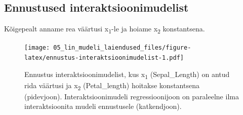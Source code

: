 \documentclass[]{book}
\newenvironment{Shaded}{\begin{snugshade}}{\end{snugshade}}
\newcommand{\DataTypeTok}[1]{\textcolor[rgb]{0.13,0.29,0.53}{#1}}
\newcommand{\DecValTok}[1]{\textcolor[rgb]{0.00,0.00,0.81}{#1}}
\newcommand{\KeywordTok}[1]{\textcolor[rgb]{0.13,0.29,0.53}{\textbf{#1}}}
\newcommand{\NormalTok}[1]{#1}
\newcommand{\OperatorTok}[1]{\textcolor[rgb]{0.81,0.36,0.00}{\textbf{#1}}}
\newcommand{\StringTok}[1]{\textcolor[rgb]{0.31,0.60,0.02}{#1}}
\begin{document}
\hypertarget{ennustused-interaktsioonimudelist}{%
\subsection*{Ennustused interaktsioonimudelist}\label{ennustused-interaktsioonimudelist}}

Kõigepealt anname rea väärtusi x\textsubscript{1}-le ja hoiame x\textsubscript{2} konstantsena.



\begin{Shaded}
\end{Shaded}

\begin{figure}
\centering
\texttt{[image: 05\_lin\_mudeli\_laiendused\_files/figure-latex/ennustus-interaktsioonimudelist-1.pdf]}
\caption{\label{fig:ennustus-interaktsioonimudelist}Ennustus interaktsioonimudelist, kus x\textsubscript{1} (Sepal\_Length) on antud rida väärtusi ja x\textsubscript{2} (Petal\_length) hoitakse konstantsena (pidevjoon). Interaktsioonimudeli regressioonijoon on paraleelne ilma interaktsioonita mudeli ennustusele (katkendjoon).}
\end{figure}
\end{document}
